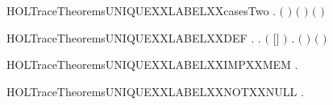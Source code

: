 \newcommand{\HOLTraceTheoremsUNIQUEXXLABELXXcasesOne}{\UseVerbatim{HOLTraceTheoremsUNIQUEXXLABELXXcasesOne}}
\begin{SaveVerbatim}{HOLTraceTheoremsUNIQUEXXLABELXXcasesTwo}
\HOLTokenTurnstile{} \HOLSymConst{\HOLTokenForall{}}  .
        \ensuremath{(} \ensuremath{)} \ensuremath{(} \HOLSymConst{::}\ensuremath{)} \HOLSymConst{\HOLTokenEquiv{}}
       \ensuremath{(} \HOLSymConst{\ensuremath{=}} \ensuremath{)} \HOLSymConst{\HOLTokenConj{}}  
\end{SaveVerbatim}
\newcommand{\HOLTraceTheoremsUNIQUEXXLABELXXcasesTwo}{\UseVerbatim{HOLTraceTheoremsUNIQUEXXLABELXXcasesTwo}}
\begin{SaveVerbatim}{HOLTraceTheoremsUNIQUEXXLABELXXDEF}
\HOLTokenTurnstile{} \HOLSymConst{\HOLTokenForall{}} .
          \HOLSymConst{\HOLTokenEquiv{}}
       \HOLSymConst{\HOLTokenExists{}} .
           \ensuremath{(} \HOLSymConst{++} \ensuremath{[}\ensuremath{]} \HOLSymConst{++}  \HOLSymConst{\ensuremath{=}} \ensuremath{)} \HOLSymConst{\HOLTokenConj{}}
           \HOLSymConst{\HOLTokenNeg{}}\HOLSymConst{\HOLTokenExists{}}.  \ensuremath{(} \ensuremath{)}  \HOLSymConst{\HOLTokenDisj{}}  \ensuremath{(} \ensuremath{)} 
\end{SaveVerbatim}
\newcommand{\HOLTraceTheoremsUNIQUEXXLABELXXDEF}{\UseVerbatim{HOLTraceTheoremsUNIQUEXXLABELXXDEF}}
\begin{SaveVerbatim}{HOLTraceTheoremsUNIQUEXXLABELXXIMPXXMEM}
\HOLTokenTurnstile{} \HOLSymConst{\HOLTokenForall{}} .    \HOLSymConst{\HOLTokenImp{}}   
\end{SaveVerbatim}
\newcommand{\HOLTraceTheoremsUNIQUEXXLABELXXIMPXXMEM}{\UseVerbatim{HOLTraceTheoremsUNIQUEXXLABELXXIMPXXMEM}}
\begin{SaveVerbatim}{HOLTraceTheoremsUNIQUEXXLABELXXNOTXXNULL}
\HOLTokenTurnstile{} \HOLSymConst{\HOLTokenForall{}} .    \HOLSymConst{\HOLTokenImp{}} \HOLSymConst{\HOLTokenNeg{}} 
\end{SaveVerbatim}
